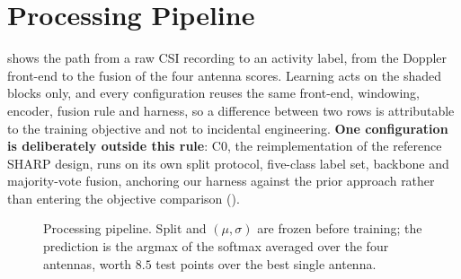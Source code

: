 
\section{Processing Pipeline}
\label{sec:processing_architecture}

 shows the path from a raw CSI recording to an activity
label, from the Doppler front-end to the fusion of the four antenna scores.
Learning acts on the shaded blocks only, and every configuration reuses the
same front-end, windowing, encoder, fusion rule and harness, so a
difference between two rows is attributable to the training objective and not
to incidental engineering. \textbf{One configuration is deliberately outside
this rule}: C0, the reimplementation of the reference SHARP design, runs on
its own split protocol, five-class label set, backbone and majority-vote
fusion, anchoring our harness against the prior approach rather than entering
the objective comparison ().

\begin{figure}[t]
\centering
{}
\caption{Processing pipeline. Split and $(\mu,\sigma)$ are frozen before
training; the prediction is the argmax of the softmax averaged over the four
antennas, worth $8.5$ test points over the best single antenna.}
\label{fig:pipeline}
\end{figure}

